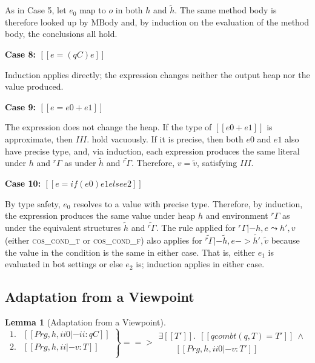 \documentclass[final,10pt,twoside]{article}
\def\qed{\unskip\kern 10pt{\unitlength1pt\linethickness{.4pt}\framebox(6,6){}}}
\newtheorem{lemma}[definition]{Lem\-ma}
\newcommand\proofcase[1]{\vspace{4mm plus 1mm minus 1mm}\noindent\textbf{#1}}
\newcommand{\rG}{\ensuremath{\mathit{^{r}\!\Gamma}}}
\begin{document}
As in Case 5, let $e_0$ map to $o$ in both $h$ and $\tilde{h}$. The same method
body is therefore looked up by $\mathrm{MBody}$ and, by induction on the
evaluation of the method body, the conclusions all hold.

\proofcase{Case 8: $[[e = (qC) e]]$}

Induction applies directly; the expression changes neither the output heap nor
the value produced.

\proofcase{Case 9: $[[e = e0 + e1]]$}

The expression does not change the heap. If the type of $[[e0 + e1]]$ is
approximate, then $III.$ hold vacuously. If it is precise, then both $e0$ and
$e1$ also have precise type, and, via induction, each expression produces the
same literal under $h$ and $\rG$ as under $\tilde{h}$ and $\tilde{\rG}$.
Therefore, $v = \tilde{v}$, satisfying $III.$

\proofcase{Case 10: $[[e = if (e0) { e1 } else { e2 }]]$}

By type safety, $e_0$ resolves to a value with precise type. Therefore, by
induction, the expression produces the same value under heap $h$ and
environment $\rG$ as under the equivalent structures $\tilde{h}$ and
$\tilde{\rG}$. The rule applied for $\rG |- h, e \leadsto h', v$
(either \textsc{cos\_cond\_t} or \textsc{cos\_cond\_f})
also applies for 
$\tilde{\rG} |- \tilde{h}, e -> \tilde{h'}, \tilde{v}$ because the value in the
condition is the same in either case. That is, either $e_1$ is evaluated in bot
settings or else $e_2$ is; induction applies in either case.
\qed


\subsection{Adaptation from a Viewpoint}

\begin{lemma}[Adaptation from a Viewpoint]
\label{lemma:comp}
\[
\left.
\begin{array}{ll}
1. & [[Prg, h, ii0 |- ii : q C]]\\
2. & [[Prg, h, ii |- v : T]]\\
\end{array}
\right\} ==>
\begin{array}{l}
\exists [[T']].\ \ 
[[qcombt(q, T) = T']]\ \wedge \\
\qquad
[[Prg, h, ii0 |- v : T']]
\end{array}
\]
\end{lemma}
\end{document}
